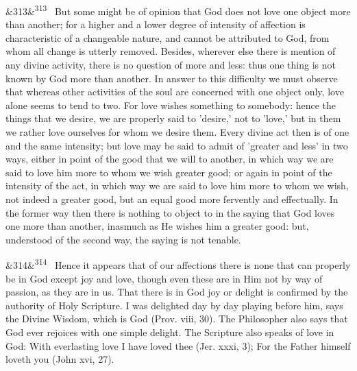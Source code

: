 \documentclass[12pt]{article}
\newcommand{\para}[1][]{\par\noindent\ifx&#1&\else\textsuperscript{\footnotesize #1}~\fi}
\begin{document}
\para[313] But some might be of opinion that God does not love one object more than another; for a higher and a lower degree of intensity of affection is characteristic of a changeable nature, and cannot be attributed to God, from whom all change is utterly removed. Besides, wherever else there is mention of any divine activity, there is no question of more and less: thus one thing is not known by God more than another. In answer to this difficulty we must observe that whereas other activities of the soul are concerned with one object only, love alone seems to tend to two. For love wishes something to somebody: hence the things that we desire, we are properly said to 'desire,' not to 'love,' but in them we rather love ourselves for whom we desire them. Every divine act then is of one and the same intensity; but love may be said to admit of 'greater and less' in two ways, either in point of the good that we will to another, in which way we are said to love him more to whom we wish greater good; or again in point of the intensity of the act, in which way we are said to love him more to whom we wish, not indeed a greater good, but an equal good more fervently and effectually. In the former way then there is nothing to object to in the saying that God loves one more than another, inasmuch as He wishes him a greater good: but, understood of the second way, the saying is not tenable.

\para[314] Hence it appears that of our affections there is none that can properly be in God except joy and love, though even these are in Him not by way of passion, as they are in us. That there is in God joy or delight is confirmed by the authority of Holy Scripture. I was delighted day by day playing before him, says the Divine Wisdom, which is God (Prov. viii, 30). The Philosopher also says that God ever rejoices with one simple delight. The Scripture also speaks of love in God: With everlasting love I have loved thee (Jer. xxxi, 3); For the Father himself loveth you (John xvi, 27).
\end{document}
